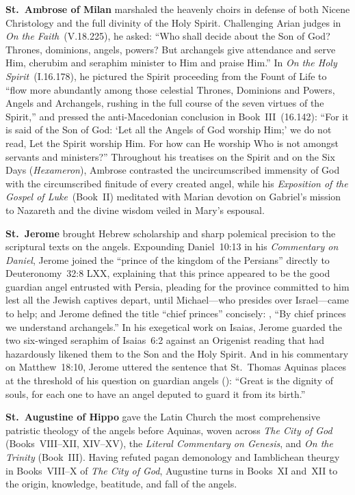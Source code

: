 \textbf{St.~Ambrose of Milan} marshaled the heavenly choirs in defense of both Nicene Christology and the full divinity of the Holy Spirit. Challenging Arian judges in \emph{On the Faith}~(V.18.225), he asked: ``Who shall decide about the Son of God? Thrones, dominions, angels, powers? But archangels give attendance and serve Him, cherubim and seraphim minister to Him and praise Him.'' In \emph{On the Holy Spirit}~(I.16.178), he pictured the Spirit proceeding from the Fount of Life to ``flow more abundantly among those celestial Thrones, Dominions and Powers, Angels and Archangels, rushing in the full course of the seven virtues of the Spirit,'' and pressed the anti-Macedonian conclusion in Book~III~(16.142): ``For it is said of the Son of God: `Let all the Angels of God worship Him;' we do not read, Let the Spirit worship Him. For how can He worship Who is not amongst servants and ministers?'' Throughout his treatises on the Spirit and on the Six Days (\emph{Hexameron}), Ambrose contrasted the uncircumscribed immensity of God with the circumscribed finitude of every created angel, while his \emph{Exposition of the Gospel of Luke}~(Book~II) meditated with Marian devotion on Gabriel's mission to Nazareth and the divine wisdom veiled in Mary's espousal.

\textbf{St.~Jerome} brought Hebrew scholarship and sharp polemical precision to the scriptural texts on the angels. Expounding Daniel~10:13 in his \emph{Commentary on Daniel}, Jerome joined the ``prince of the kingdom of the Persians'' directly to Deuteronomy~32:8 LXX, explaining that this prince appeared to be the good guardian angel entrusted with Persia, pleading for the province committed to him lest all the Jewish captives depart, until Michael---who presides over Israel---came to help; and Jerome defined the title ``chief princes'' concisely: , ``By chief princes we understand archangels.'' In his exegetical work on Isaias, Jerome guarded the two six-winged seraphim of Isaias~6:2 against an Origenist reading that had hazardously likened them to the Son and the Holy Spirit. And in his commentary on Matthew~18:10, Jerome uttered the sentence that St.~Thomas Aquinas places at the threshold of his question on guardian angels (): ``Great is the dignity of souls, for each one to have an angel deputed to guard it from its birth.''

\textbf{St.~Augustine of Hippo} gave the Latin Church the most comprehensive patristic theology of the angels before Aquinas, woven across \emph{The City of God} (Books~VIII--XII, XIV--XV), the \emph{Literal Commentary on Genesis}, and \emph{On the Trinity} (Book~III). Having refuted pagan demonology and Iamblichean theurgy in Books~VIII--X of \emph{The City of God}, Augustine turns in Books~XI and~XII to the origin, knowledge, beatitude, and fall of the angels.


